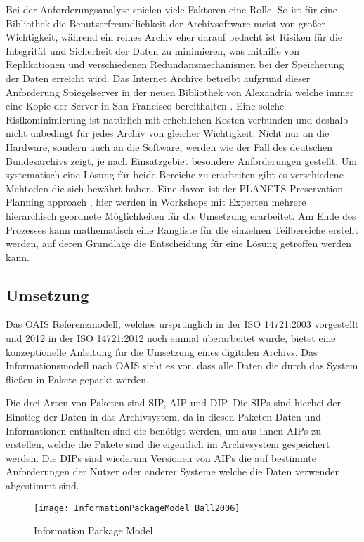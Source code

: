 \documentclass[conference,compsoc,final,a4paper]{IEEEtran}
\begin{document}
Bei der Anforderungsanalyse spielen viele Faktoren eine Rolle. So ist für eine Bibliothek die Benutzerfreundlichkeit der Archivsoftware meist von großer Wichtigkeit, während ein reines Archiv eher darauf bedacht ist Risiken für die Integrität und Sicherheit der Daten zu minimieren, was mithilfe von Replikationen und verschiedenen Redundanzmechanismen bei der Speicherung der Daten erreicht wird. Das Internet Archive betreibt aufgrund dieser Anforderung Spiegelserver in der neuen Bibliothek von Alexandria welche immer eine Kopie der Server in San Francisco bereithalten \autocite{BibAlexIAMirror}. Eine solche Risikominimierung ist natürlich mit erheblichen Kosten verbunden und deshalb nicht unbedingt für jedes Archiv von gleicher Wichtigkeit. Nicht nur an die Hardware, sondern auch an die Software, werden wie der Fall des deutschen Bundesarchivs zeigt, je nach Einsatzgebiet besondere Anforderungen gestellt. Um systematisch eine Lösung für beide Bereiche zu erarbeiten gibt es verschiedene Mehtoden die sich bewährt haben. Eine davon ist der PLANETS Preservation Planning approach \autocite{Strodl2007}, hier werden in Workshops mit Experten mehrere hierarchisch geordnete Möglichkeiten für die Umsetzung erarbeitet. Am Ende des Prozesses kann mathematisch eine Rangliste für die einzelnen Teilbereiche erstellt werden, auf deren Grundlage die Entscheidung für eine Lösung getroffen werden kann.

\subsection{Umsetzung}
Das \ac{OAIS} Referenzmodell, welches ursprünglich in der ISO 14721:2003 vorgestellt und 2012 in der ISO 14721:2012 noch einmal überarbeitet wurde, bietet eine konzeptionelle Anleitung für die Umsetzung eines digitalen Archivs. Das Informationsmodell nach \ac{OAIS} sieht es vor, dass alle Daten die durch das System fließen in Pakete gepackt werden.

Die drei Arten von Paketen sind \ac{SIP}, \ac{AIP} und \ac{DIP}. Die \ac{SIP}s sind hierbei der Einstieg der Daten in das Archivsystem, da in diesen Paketen Daten und Informationen enthalten sind die benötigt werden, um aus ihnen \ac{AIP}s zu erstellen, welche die Pakete sind die eigentlich im Archivsystem gespeichert werden. Die \ac{DIP}s sind wiederum Versionen von \ac{AIP}s die auf bestimmte Anforderungen der Nutzer oder anderer Systeme welche die Daten verwenden abgestimmt sind. 

\begin{figure}[!ht]
\centering
\texttt{[image: InformationPackageModel\_Ball2006]}
\caption{Information Package Model \autocite{Ball2006}}
\label{oais}
\end{figure}
\end{document}
